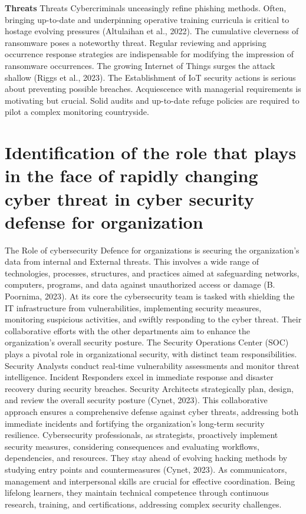  \textbf{Threats}
Threats 
Cybercriminals unceasingly refine phishing methods. Often, bringing up-to-date and underpinning operative training curricula is critical to hostage evolving pressures (Altulaihan et al., 2022). The cumulative cleverness of ransomware poses a noteworthy threat. Regular reviewing and apprising occurrence response strategies are indispensable for modifying the impression of ransomware occurrences. The growing Internet of Things surges the attack shallow (Riggs et al., 2023). The Establishment of IoT security actions is serious about preventing possible breaches. Acquiescence with managerial requirements is motivating but crucial. Solid audits and up-to-date refuge policies are required to pilot a complex monitoring countryside.

\section{Identification of the role that plays in the face of rapidly changing cyber threat in cyber security defense for organization}
\label{sec:into_back}
The Role of cybersecurity Defence for organizations is securing the organization's data from internal and External threats. This involves a wide range of technologies, processes, structures, and practices aimed at safeguarding networks, computers, programs,  and data against unauthorized access or damage (B. Poornima, 2023). At its core the cybersecurity team is tasked with shielding the IT infrastructure from vulnerabilities, implementing security measures,  monitoring suspicious activities, and swiftly responding to the cyber threat. Their collaborative efforts with the other departments aim to enhance the organization's overall security posture. 
The Security Operations Center (SOC) plays a pivotal role in organizational security, with distinct team responsibilities. Security Analysts conduct real-time vulnerability assessments and monitor threat intelligence. Incident Responders excel in immediate response and disaster recovery during security breaches. Security Architects strategically plan, design, and review the overall security posture (Cynet, 2023). This collaborative approach ensures a comprehensive defense against cyber threats, addressing both immediate incidents and fortifying the organization's long-term security resilience.
Cybersecurity professionals, as strategists, proactively implement security measures, considering consequences and evaluating workflows, dependencies, and resources. They stay ahead of evolving hacking methods by studying entry points and countermeasures (Cynet, 2023). As communicators, management and interpersonal skills are crucial for effective coordination. Being lifelong learners, they maintain technical competence through continuous research, training, and certifications, addressing complex security challenges. 

